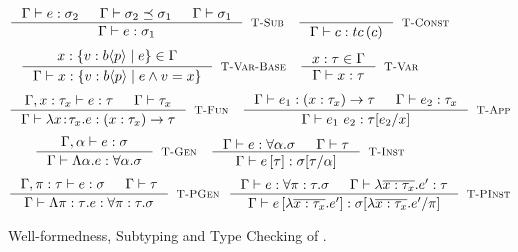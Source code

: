 \begin{figure}[p]
$$\inference
  {  \hastype{\Gamma}{e}{\sigma_2} && \isSubType{\Gamma}{\sigma_2}{\sigma_1} 
  && \isWellFormed{\Gamma}{\sigma_1}
  }
  {\hastype{\Gamma}{e}{\sigma_1}}
  [\tsub]
\quad
\inference
  {}
  {\hastype{\Gamma}{c}{\tc{c}}}
  [\tconst]
$$
$$
\inference
  {x: \tpref{b}{\areft}{\reft} \in \Gamma}
  {\hastype{\Gamma}{x}{\tpref{b}{\areft}{e \land \vref = x}}}
  [\tbase]
\quad
\inference
  {x:\tau \in \Gamma}
  {\hastype{\Gamma}{x}{\tau}} 
  [\tvariable]
$$
$$
\inference
   {\hastype{\Gamma, x:\tau_x}{e}{\tau} 
    && \isWellFormed{\Gamma}{\tau_x}
   }
   {\hastype{\Gamma}{\efunt{x}{\tau_x}{e}}{\tfun{x}{\tau_x}{\tau}}}
   [\tfunction]
\quad
\inference
   {\hastype{\Gamma}{e_1}{\tfun{x}{\tau_x}{\tau}} 
   &&  \hastype{\Gamma}{e_2}{\tau_x}
   }
   {\hastype{\Gamma}{\eapp{e_1}{e_2}}{\SUBST{\tau}{x}{e_2}}}
   [\tapp]
$$
$$
\inference
  {\hastype{\Gamma, \alpha}{e}{\sigma}}
  {\hastype{\Gamma}{\etabs{\alpha}{e}}{\ttabs{\alpha}{\sigma}}}
  [\tgen]
\quad
\inference
  {\hastype{\Gamma}{e}{\ttabs{\alpha}{\sigma}} && 
   \isWellFormed{\Gamma}{\tau}
  }
  {\hastype{\Gamma}{\etapp{e}{\tau}}{\SUBST{\sigma}{\alpha}{\tau}}}
  [\tinst]
$$
$$
\inference
    {\hastype{\Gamma, \rvar:\tau}{e}{\sigma} &&
     \isWellFormed{\Gamma}{\tau} 
    }
    {\hastype{\Gamma}{\epabs{\rvar}{\tau}{e}}{\tpabs{\rvar}{\tau}{\sigma}}}
    [\tpgen]
\ \
\inference
    {\hastype{\Gamma}{e}{\tpabs{\rvar}{\tau}{\sigma}} && 
     \hastype{\Gamma}{\efunbar{x:\tau_x}{\reft'}}{\tau}
    }
    {\hastype{\Gamma}
             {\epapp{e}{\efunbar{x:\tau_x}{\reft'}}}
             {\rpinst{\sigma}{\rvar}{\efunbar{x:\tau_x}{\reft'}}}
    }
    [\tpinst]
$$
\caption[Type checking of \corelan.]{Well-formedness, Subtyping and Type Checking of \corelan.}
\label{fig:rules}
\end{figure}

